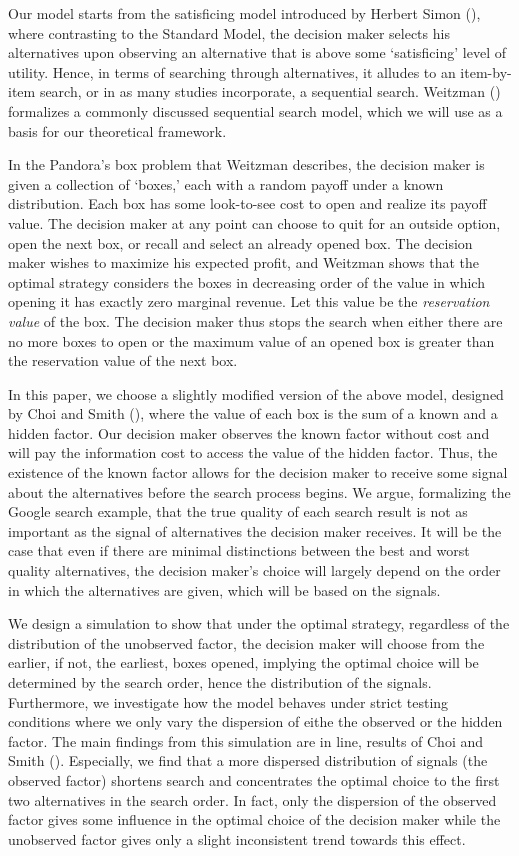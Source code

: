 \documentclass[12pt]{article}
\begin{document}
Our model starts from the satisficing  model introduced by Herbert Simon (\citeyear{Simon}), where contrasting to the Standard Model, the decision maker selects his alternatives upon observing an alternative that is above some `satisficing' level of utility. Hence, in terms of searching through alternatives, it alludes to an item-by-item search, or in as many studies incorporate, a sequential search. Weitzman (\citeyear{weitzman}) formalizes a commonly discussed sequential search model, which we will use as a basis for our theoretical framework.

In the Pandora's box problem that Weitzman describes, the decision maker is given a collection of `boxes,' each with a random payoff under a known distribution. Each box has some look-to-see cost to open and realize its payoff value. The decision maker at any point can choose to quit for an outside option, open the next box, or recall and select an already opened box. The decision maker wishes to maximize his expected profit, and Weitzman shows that the optimal strategy considers the boxes in decreasing order of the value in which opening it has exactly zero marginal revenue. Let this value be the \textit{reservation value} of the box. The decision maker thus stops the search when either there are no more boxes to open or the maximum value of an opened box is greater than the reservation value of the next box.

In this paper, we choose a slightly modified version of the above model, designed by Choi and Smith (\citeyear{Choi}), where the value of each box is the sum of a known and a hidden factor. Our decision maker observes the known factor without cost and will pay the information cost to access the value of the hidden factor. Thus, the existence of the known factor allows for the decision maker to receive some signal about the alternatives before the search process begins. We argue, formalizing the Google search example, that the true quality of each search result is not as important as the signal of alternatives the decision maker receives. It will be the case that even if there are minimal distinctions between the best and worst quality alternatives, the decision maker's choice will largely depend on the order in which the alternatives are given, which will be based on the signals.

We design a simulation to show that under the optimal strategy, regardless of the distribution of the unobserved factor, the decision maker will choose from the earlier, if not, the earliest, boxes opened, implying the optimal choice will be determined by the search order, hence the distribution of the signals. Furthermore, we investigate how the model behaves under strict testing conditions where we only vary the dispersion of eithe the observed or the hidden factor. The main findings from this simulation are in line, results of Choi and Smith (\citeyear{Choi}). Especially, we find that a more dispersed distribution of signals (the observed factor) shortens search and concentrates the optimal choice to the first two alternatives in the search order. In fact, only the dispersion of the observed factor gives some influence in the optimal choice of the decision maker while the unobserved factor gives only a slight inconsistent trend towards this effect.
\end{document}
